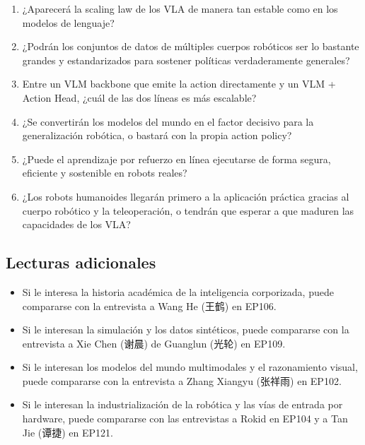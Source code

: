 \begin{enumerate}
\item ¿Aparecerá la scaling law de los VLA de manera tan estable como en los modelos de lenguaje?
\item ¿Podrán los conjuntos de datos de múltiples cuerpos robóticos ser lo bastante grandes y estandarizados para sostener políticas verdaderamente generales?
\item Entre un VLM backbone que emite la action directamente y un VLM + Action Head, ¿cuál de las dos líneas es más escalable?
\item ¿Se convertirán los modelos del mundo en el factor decisivo para la generalización robótica, o bastará con la propia action policy?
\item ¿Puede el aprendizaje por refuerzo en línea ejecutarse de forma segura, eficiente y sostenible en robots reales?
\item ¿Los robots humanoides llegarán primero a la aplicación práctica gracias al cuerpo robótico y la teleoperación, o tendrán que esperar a que maduren las capacidades de los VLA?
\end{enumerate}

\subsection{Lecturas adicionales}

\begin{itemize}
\item Si le interesa la historia académica de la inteligencia corporizada, puede compararse con la entrevista a Wang He (王鹤) en EP106.
\item Si le interesan la simulación y los datos sintéticos, puede compararse con la entrevista a Xie Chen (谢晨) de Guanglun (光轮) en EP109.
\item Si le interesan los modelos del mundo multimodales y el razonamiento visual, puede compararse con la entrevista a Zhang Xiangyu (张祥雨) en EP102.
\item Si le interesan la industrialización de la robótica y las vías de entrada por hardware, puede compararse con las entrevistas a Rokid en EP104 y a Tan Jie (谭捷) en EP121.
\end{itemize}


